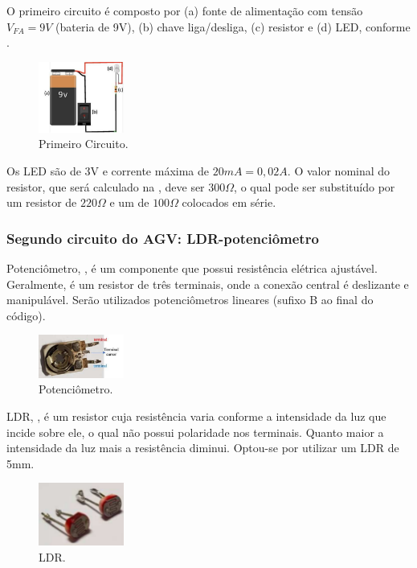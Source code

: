 \documentclass{textolivre}
\begin{document}
O primeiro circuito é composto por (a) fonte de alimentação com tensão $V_{FA} = 9V$
(bateria de 9V), (b) chave liga/desliga, (c) resistor e (d) LED,
conforme .

\begin{figure}[htbp]
\centering
\includegraphics[width=0.25\textwidth]{figure-13.pdf}
\caption{Primeiro Circuito.}
\label{fig07}
\end{figure}

Os LED são de 3V e corrente máxima de $20mA = 0,02A$. O valor nominal do
resistor, que será calculado na , deve ser $300\Omega$, o qual pode ser
substituído por um resistor de $220\Omega$ e um de $100\Omega$ colocados em série.


\subsubsection{Segundo circuito do AGV: LDR-potenciômetro}\label{sec-seg-circ}
Potenciômetro, , é um componente que possui resistência elétrica
ajustável. Geralmente, é um resistor de três terminais, onde a conexão central
é deslizante e manipulável. Serão utilizados potenciômetros lineares (sufixo B
ao final do código).

\begin{figure}[htbp]
\centering
\includegraphics[width=0.25\textwidth]{figure-14.pdf}
\caption{Potenciômetro.}
\label{fig08}
\end{figure}

LDR, , é um resistor cuja resistência varia conforme a intensidade da
luz que incide sobre ele, o qual não possui polaridade nos terminais. Quanto
maior a intensidade da luz mais a resistência diminui. Optou-se por utilizar um
LDR de 5mm.

\begin{figure}[htbp]
\centering
\includegraphics[width=0.25\textwidth]{figure-15.pdf}
\caption{LDR.}
\label{fig09}
\end{figure}
\end{document}
